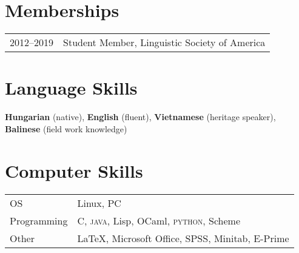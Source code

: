 \documentclass[11pt]{article} %
\begin{document}
\section*{Memberships}
\begin{longtable}{p{1in} p{5.3in}}
2012--2019 & Student Member, Linguistic Society of America
\end{longtable}


\section*{Language Skills}

\textbf{Hungarian} (native), \textbf{English} (fluent), \textbf{Vietnamese} (heritage speaker), \textbf{Balinese} (field work knowledge)



\section*{Computer Skills}
\begin{tabular}{p{1in} p{5.3in}}
{OS} & {Linux, PC} \\
{Programming} & { C, \textsc{java}, Lisp, OCaml, \textsc{python}, Scheme} \\
{Other} & {\LaTeX, Microsoft Office, SPSS, Minitab, E-Prime} \\
\end{tabular}






\end{document}
